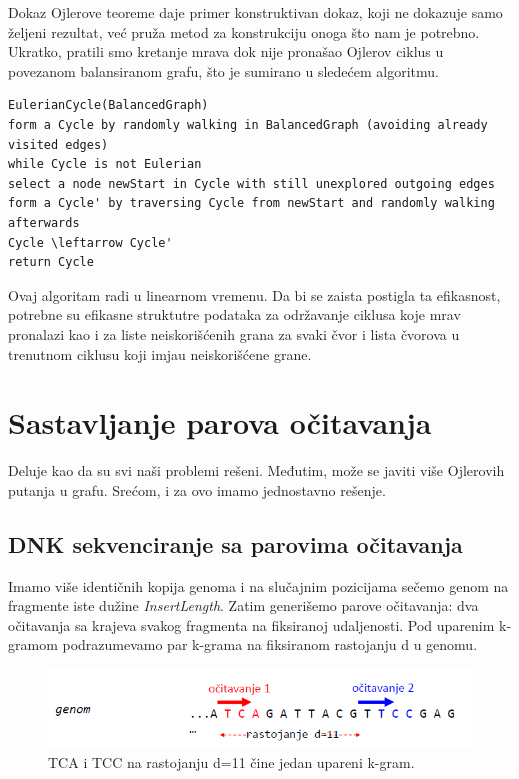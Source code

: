 Dokaz Ojlerove teoreme daje primer konstruktivan dokaz, koji ne dokazuje samo željeni rezultat, već pruža metod za konstrukciju onoga što nam je potrebno. Ukratko, pratili smo kretanje mrava dok nije pronašao Ojlerov ciklus u povezanom balansiranom grafu, što je sumirano u sledećem algoritmu.


\begin{verbatim}
EulerianCycle(BalancedGraph)
form a Cycle by randomly walking in BalancedGraph (avoiding already visited edges)
while Cycle is not Eulerian
select a node newStart in Cycle with still unexplored outgoing edges
form a Cycle' by traversing Cycle from newStart and randomly walking afterwards
Cycle \leftarrow Cycle'
return Cycle
\end{verbatim}

Ovaj algoritam radi u linearnom vremenu. Da bi se zaista postigla ta efikasnost, potrebne su efikasne struktutre podataka za održavanje ciklusa koje mrav pronalazi kao i za liste neiskorišćenih grana za svaki čvor i lista čvorova u trenutnom ciklusu koji imjau neiskorišćene grane.


\section{Sastavljanje parova očitavanja}

Deluje kao da su svi naši problemi rešeni. Međutim, može se javiti više Ojlerovih putanja u grafu. Srećom, i za ovo imamo jednostavno rešenje.

\subsection{DNK sekvenciranje sa parovima očitavanja} 

Imamo više identičnih kopija genoma i na slučajnim pozicijama sečemo genom na fragmente iste dužine \textit{InsertLength}. Zatim generišemo parove očitavanja: dva očitavanja sa krajeva svakog fragmenta na fiksiranoj udaljenosti.
Pod uparenim k-gramom podrazumevamo par k-grama na fiksiranom rastojanju d u genomu.

\begin{figure}[H]
	\centering
	\includegraphics[width=1\textwidth]{poglavlja/3/slike/upareni_kgram.png}
	\caption{TCA i TCC na rastojanju d=11 čine jedan upareni k-gram.}
	\label{slika:upareni}
\end{figure} 

